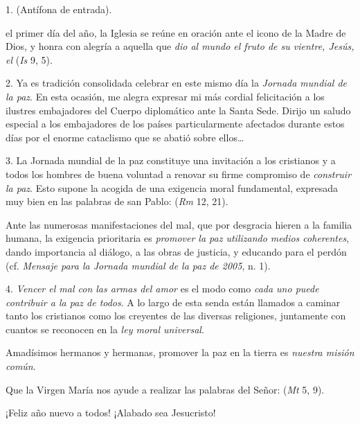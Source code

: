 \begin{body}
	1.  (Antífona de entrada).
	
	 el primer día del año, la Iglesia se reúne en oración ante el icono de la Madre de Dios, y honra con alegría a aquella que \emph{dio al mundo el fruto de su vientre, Jesús, el } (\emph{Is} 9, 5).
	
	2. Ya es tradición consolidada celebrar en este mismo día la \emph{Jornada mundial de la paz}. En esta ocasión, me alegra expresar mi más cordial felicitación a los ilustres embajadores del Cuerpo diplomático ante la Santa Sede. Dirijo un saludo especial a los embajadores de los países particularmente afectados durante estos días por el enorme cataclismo que se abatió sobre ellos\ldots{}
	
	3. La Jornada mundial de la paz constituye una invitación a los cristianos y a todos los hombres de buena voluntad a renovar su firme compromiso de \emph{construir la paz}. Esto supone la acogida de una exigencia moral fundamental, expresada muy bien en las palabras de san Pablo:  (\emph{Rm} 12, 21).
	
	Ante las numerosas manifestaciones del mal, que por desgracia hieren a la familia humana, la exigencia prioritaria es \emph{promover la paz utilizando medios coherentes}, dando importancia al diálogo, a las obras de justicia, y educando para el perdón (cf. \emph{Mensaje para la Jornada mundial de la paz de 2005}, n. 1).
	
	4. \emph{Vencer el mal con las armas del amor} es el modo como \emph{cada uno puede contribuir a la paz de todos}. A lo largo de esta senda están llamados a caminar tanto los cristianos como los creyentes de las diversas religiones, juntamente con cuantos se reconocen en la \emph{ley moral universal}.
	
	Amadísimos hermanos y hermanas, promover la paz en la tierra es \emph{nuestra misión común}.
	
	Que la Virgen María nos ayude a realizar las palabras del Señor:  (\emph{Mt} 5, 9).
	
	¡Feliz año nuevo a todos! ¡Alabado sea Jesucristo!
\end{body}

\newsection

